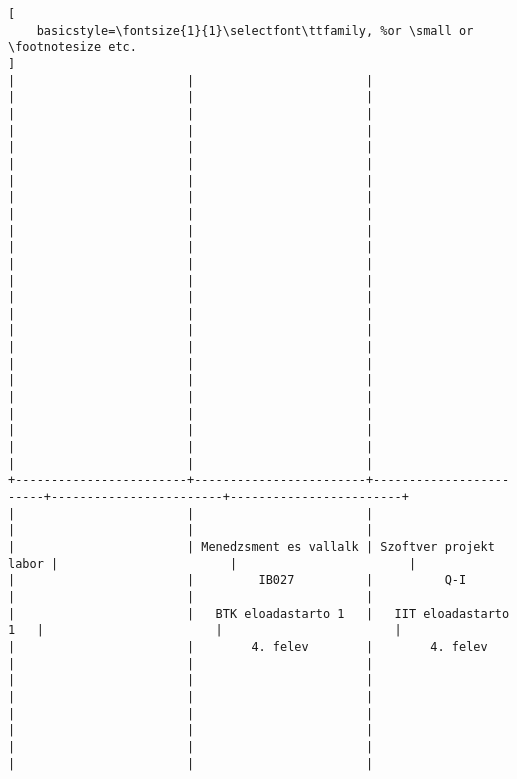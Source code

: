 \begin{lstlisting}[
    basicstyle=\fontsize{1}{1}\selectfont\ttfamily, %or \small or \footnotesize etc.
]
|                        |                        |                        |                        |                        | 
|                        |                        |                        |                        |                        | 
|                        |                        |                        |                        |                        | 
|                        |                        |                        |                        |                        | 
|                        |                        |                        |                        |                        | 
|                        |                        |                        |                        |                        | 
|                        |                        |                        |                        |                        | 
|                        |                        |                        |                        |                        | 
|                        |                        |                        |                        |                        | 
|                        |                        |                        |                        |                        | 
|                        |                        |                        |                        |                        | 
|                        |                        |                        |                        |                        | 
+------------------------+------------------------+------------------------+------------------------+------------------------+
|                        |                        |                        |                        |                        | 
|                        | Menedzsment es vallalk | Szoftver projekt labor |                        |                        | 
|                        |         IB027          |          Q-I           |                        |                        | 
|                        |   BTK eloadastarto 1   |   IIT eloadastarto 1   |                        |                        | 
|                        |        4. felev        |        4. felev        |                        |                        | 
|                        |                        |                        |                        |                        | 
|                        |                        |                        |                        |                        | 
|                        |                        |                        |                        |                        | 

\end{lstlisting}
